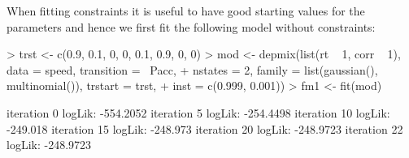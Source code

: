 \documentclass[article]{jss}
\begin{document}
When fitting constraints it is useful to have good starting values 
for the parameters and hence we first fit the following model without
constraints:
\begin{Schunk}
\begin{Sinput}
> trst <- c(0.9, 0.1, 0, 0, 0.1, 0.9, 0, 0)
> mod <- depmix(list(rt ~ 1, corr ~ 1), data = speed, transition = ~Pacc, 
+     nstates = 2, family = list(gaussian(), multinomial()), trstart = trst, 
+     inst = c(0.999, 0.001))
> fm1 <- fit(mod)
\end{Sinput}
\begin{Soutput}
iteration 0 logLik: -554.2052 
iteration 5 logLik: -254.4498 
iteration 10 logLik: -249.018 
iteration 15 logLik: -248.973 
iteration 20 logLik: -248.9723 
iteration 22 logLik: -248.9723 
\end{Soutput}
\end{Schunk}
\end{document}
